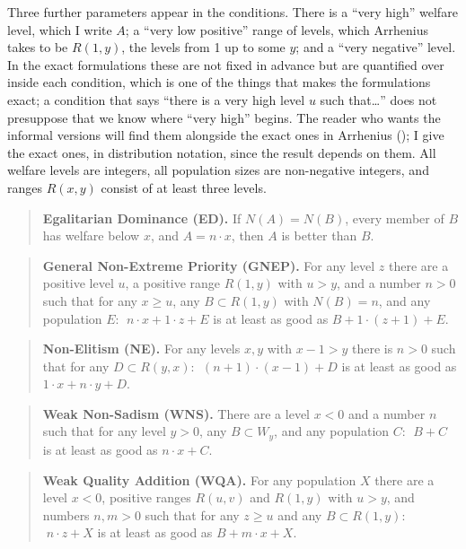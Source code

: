 \documentclass[
  11pt,
  letterpaper,
  DIV=11,
  numbers=noendperiod,
  twoside]{scrartcl}
\begin{document}
Three further parameters appear in the conditions. There is a ``very
high'' welfare level, which I write \(A\); a ``very low positive'' range
of levels, which Arrhenius takes to be \(R(1,y)\), the levels from 1 up
to some \(y\); and a ``very negative'' level. In the exact formulations
these are not fixed in advance but are quantified over inside each
condition, which is one of the things that makes the formulations exact;
a condition that says ``there is a very high level \(u\) such
that\ldots{}'' does not presuppose that we know where ``very high''
begins. The reader who wants the informal versions will find them
alongside the exact ones in Arrhenius
(); I give the exact ones, in
distribution notation, since the result depends on them. All welfare
levels are integers, all population sizes are non-negative integers, and
ranges \(R(x,y)\) consist of at least three levels.

\begin{quote}
\textbf{Egalitarian Dominance (ED).} If \(N(A) = N(B)\), every member of
\(B\) has welfare below \(x\), and \(A = n \cdot x\), then \(A\) is
better than \(B\).
\end{quote}

\begin{quote}
\textbf{General Non-Extreme Priority (GNEP).} For any level \(z\) there
are a positive level \(u\), a positive range \(R(1,y)\) with \(u > y\),
and a number \(n > 0\) such that for any \(x \geq u\), any
\(B \subset R(1,y)\) with \(N(B) = n\), and any population \(E\):
\(\;n \cdot x + 1\cdot z + E\) is at least as good as
\(B + 1 \cdot (z+1) + E\).
\end{quote}

\begin{quote}
\textbf{Non-Elitism (NE).} For any levels \(x, y\) with \(x - 1 > y\)
there is \(n > 0\) such that for any \(D \subset R(y, x)\):
\(\;(n+1) \cdot (x-1) + D\) is at least as good as
\(1 \cdot x + n \cdot y + D\).
\end{quote}

\begin{quote}
\textbf{Weak Non-Sadism (WNS).} There are a level \(x < 0\) and a number
\(n\) such that for any level \(y > 0\), any \(B \subset W_y\), and any
population \(C\): \(\;B + C\) is at least as good as \(n \cdot x + C\).
\end{quote}

\begin{quote}
\textbf{Weak Quality Addition (WQA).} For any population \(X\) there are
a level \(x < 0\), positive ranges \(R(u,v)\) and \(R(1,y)\) with
\(u > y\), and numbers \(n, m > 0\) such that for any \(z \geq u\) and
any \(B \subset R(1,y)\): \(\;n \cdot z + X\) is at least as good as
\(B + m \cdot x + X\).
\end{quote}
\end{document}
